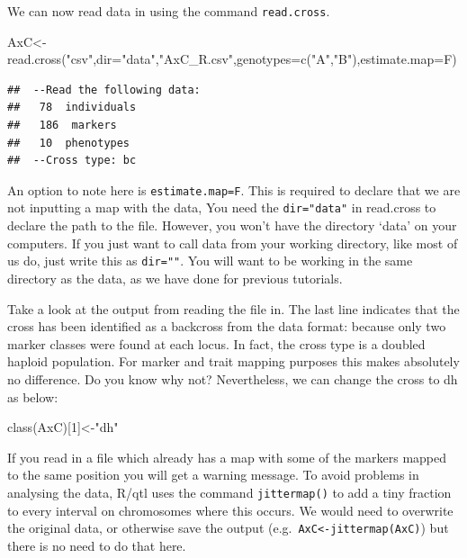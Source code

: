 \documentclass[
]{book}
\newenvironment{Shaded}{\begin{snugshade}}{\end{snugshade}}
\newcommand{\AttributeTok}[1]{\textcolor[rgb]{0.77,0.63,0.00}{#1}}
\newcommand{\DecValTok}[1]{\textcolor[rgb]{0.00,0.00,0.81}{#1}}
\newcommand{\FunctionTok}[1]{\textcolor[rgb]{0.00,0.00,0.00}{#1}}
\newcommand{\NormalTok}[1]{#1}
\newcommand{\OtherTok}[1]{\textcolor[rgb]{0.56,0.35,0.01}{#1}}
\newcommand{\StringTok}[1]{\textcolor[rgb]{0.31,0.60,0.02}{#1}}
\begin{document}
We can now read data in using the command \texttt{read.cross}.

\begin{Shaded}
\begin{Highlighting}[]
\NormalTok{AxC}\OtherTok{\textless{}{-}}\FunctionTok{read.cross}\NormalTok{(}\StringTok{"csv"}\NormalTok{,}\AttributeTok{dir=}\StringTok{"data"}\NormalTok{,}\StringTok{"AxC\_R.csv"}\NormalTok{,}\AttributeTok{genotypes=}\FunctionTok{c}\NormalTok{(}\StringTok{"A"}\NormalTok{,}\StringTok{"B"}\NormalTok{),}\AttributeTok{estimate.map=}\NormalTok{F)}
\end{Highlighting}
\end{Shaded}

\begin{verbatim}
##  --Read the following data:
##   78  individuals
##   186  markers
##   10  phenotypes
##  --Cross type: bc
\end{verbatim}

An option to note here is \texttt{estimate.map=F}. This is required to declare that we are not inputting a map with the data, You need the \texttt{dir="data"} in read.cross to declare the path to the file. However, you won't have the directory `data' on your computers. If you just want to call data from your working directory, like most of us do, just write this as \texttt{dir=""}. You will want to be working in the same directory as the data, as we have done for previous tutorials.

Take a look at the output from reading the file in. The last line indicates that the cross has been identified as a backcross from the data format: because only two marker classes were found at each locus. In fact, the cross type is a doubled haploid population. For marker and trait mapping purposes this makes absolutely no difference. Do you know why not? Nevertheless, we can change the cross to dh as below:

\begin{Shaded}
\begin{Highlighting}[]
\FunctionTok{class}\NormalTok{(AxC)[}\DecValTok{1}\NormalTok{]}\OtherTok{\textless{}{-}}\StringTok{"dh"} 
\end{Highlighting}
\end{Shaded}

If you read in a file which already has a map with some of the markers mapped to the same position you will get a warning message. To avoid problems in analysing the data, R/qtl uses the command \texttt{jittermap()} to add a tiny fraction to every interval on chromosomes where this occurs. We would need to overwrite the original data, or otherwise save the output (e.g.~\texttt{AxC\textless{}-jittermap(AxC)}) but there is no need to do that here.
\end{document}
